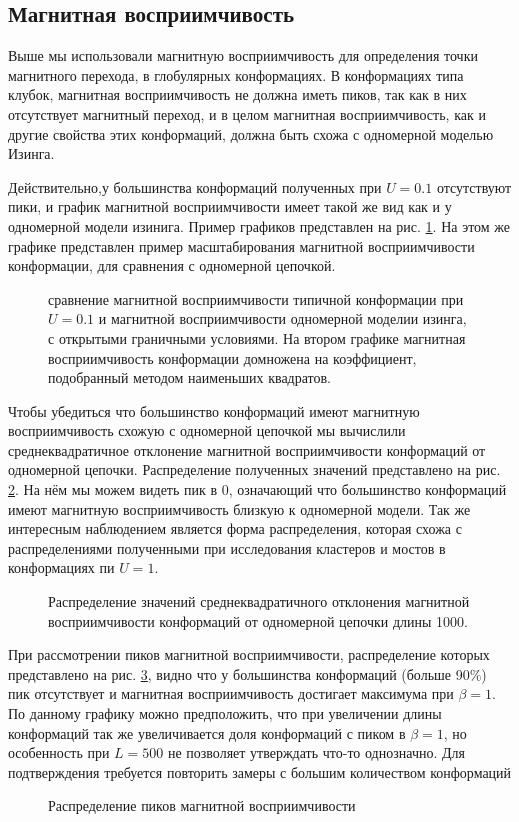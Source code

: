 \subsection{Магнитная восприимчивость}
Выше мы использовали магнитную восприимчивость для определения точки магнитного перехода, в глобулярных конформациях. В конформациях типа клубок, магнитная восприимчивость не должна иметь пиков, так как в них отсутствует магнитный переход, и в целом магнитная восприимчивость, как и другие свойства этих конформаций, должна быть схожа с одномерной моделью Изинга.

Действительно,у большинства конформаций полученных при $U=0.1$ отсутствуют пики, и график магнитной восприимчивости имеет такой же вид как и у одномерной модели изинига. Пример графиков представлен на рис. \ref{fig:MS_1D_comparison}. На этом же графике представлен пример масштабирования магнитной восприимчивости конформации, для сравнения с одномерной цепочкой.

\begin{figure}[ht]
	\centering
	
	\caption{сравнение магнитной восприимчивости типичной конформации при $U=0.1$ и магнитной восприимчивости одномерной моделии изинга, с открытыми граничными условиями. На втором графике магнитная восприимчивость конформации домножена на коэффициент, подобранный методом наименьших квадратов.}
	\label{fig:MS_1D_comparison}
\end{figure}


Чтобы убедиться что большинство конформаций имеют магнитную восприимчивость схожую с одномерной цепочкой мы вычислили среднеквадратичное отклонение магнитной восприимчивости конформаций от одномерной цепочки. Распределение полученных значений представлено на рис. \ref{fig:MS_1D_dif_distr}. На нём мы можем видеть пик в 0, означающий что большинство конформаций имеют магнитную восприимчивость близкую к одномерной модели. Так же интересным наблюдением является форма распределения, которая схожа с распределениями полученными при исследования кластеров и мостов в конформациях пи $U=1$.

\begin{figure}[ht]
	\centering
	
	\caption{Распределение значений среднеквадратичного отклонения магнитной восприимчивости конформаций от одномерной цепочки длины 1000.}
	\label{fig:MS_1D_dif_distr}
\end{figure}

При рассмотрении пиков магнитной восприимчивости, распределение которых представлено на рис. \ref{fig:MS_peaks_distr}, видно что у большинства конформаций (больше 90\%) пик отсутствует и магнитная восприимчивость достигает максимума при $\beta = 1$. По данному графику можно предположить, что при увеличении длины конформаций так же увеличивается доля конформаций с пиком в $\beta = 1$, но особенность при $L=500$ не позволяет утверждать что-то однозначно. Для подтверждения требуется повторить замеры с большим количеством конформаций


\begin{figure}[ht]
	\centering
	
	\caption{Распределение пиков магнитной восприимчивости}
	\label{fig:MS_peaks_distr}
\end{figure}